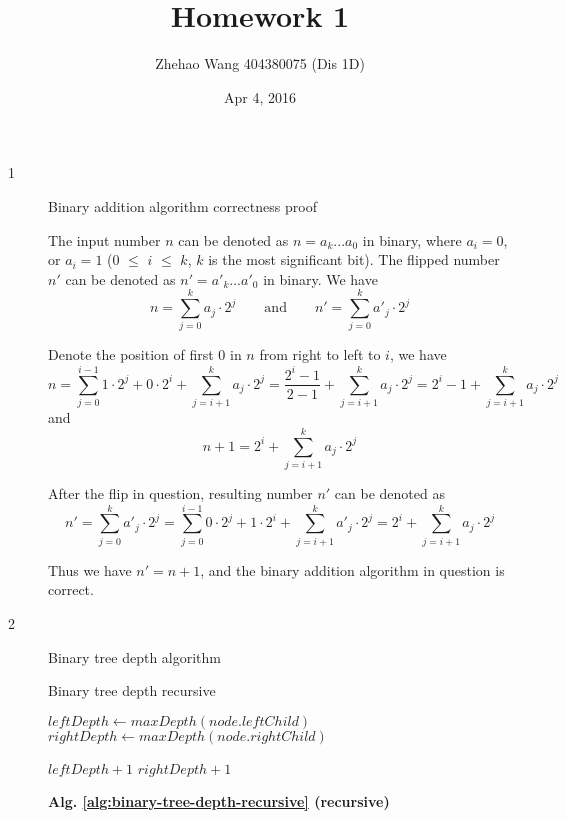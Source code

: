 \documentclass{article}
\title{Homework 1}
\author{Zhehao Wang 404380075 (Dis 1D)}
\date{Apr 4, 2016}
\begin{document}
\maketitle

\begin{description}

\item[1]{Binary addition algorithm correctness proof}
  
  The input number $n$ can be denoted as $n=a_k...a_0$ in binary, where $a_i=0$, or $a_i=1$ ($0$ $\leq$ $i$ $\leq$ $k$, $k$ is the most significant bit). The flipped number $n'$ can be denoted as  $n'=a'_k...a'_0$ in binary.
  We have 
  \[
  n = \sum_{j=0}^{k}{a_j \cdot 2^j}
  \qquad \text{and} \qquad 
  n' = \sum_{j=0}^{k}{a'_j \cdot 2^j}
  \]
  
  Denote the position of first $0$ in $n$ from right to left to $i$, we have 
  $$n = \sum_{j=0}^{i-1}{1 \cdot 2^j} + 0 \cdot 2^i + \sum_{j=i+1}^{k}{a_j \cdot 2^j} = \frac{2^i-1}{2-1} + \sum_{j=i+1}^{k}{a_j \cdot 2^j} = 2^i - 1 + \sum_{j=i+1}^{k}{a_j \cdot 2^j}$$ 
  and
  $$n + 1 = 2^i + \sum_{j=i+1}^{k}{a_j \cdot 2^j}$$

  After the flip in question, resulting number $n'$ can be denoted as
  $$n' = \sum_{j=0}^{k}{a'_j \cdot 2^j} = \sum_{j=0}^{i-1}{0 \cdot 2^j} + 1 \cdot 2^i + \sum_{j=i+1}^{k}{a'_j \cdot 2^j} = 2^i + \sum_{j=i+1}^{k}{a_j \cdot 2^j}$$

  Thus we have $n' = n + 1$, and the binary addition algorithm in question is correct.

\item[2]{Binary tree depth algorithm}

  \begin{algorithm}[h]
  \caption{Binary tree depth recursive}
  \label{alg:binary-tree-depth-recursive}
    \begin{algorithmic}[1]
        \State {}
      \EndIf

      \State $leftDepth \gets maxDepth(node.leftChild)$
      \State $rightDepth \gets maxDepth(node.rightChild)$

        \State \Return $leftDepth + 1$
      \Else {} 
        \State \Return $rightDepth + 1$
      \EndIf
    \EndFunction
    \end{algorithmic}
  \end{algorithm}

  \textbf{Alg. \ref{alg:binary-tree-depth-recursive} (recursive)}


\end{description}
\end{document}
